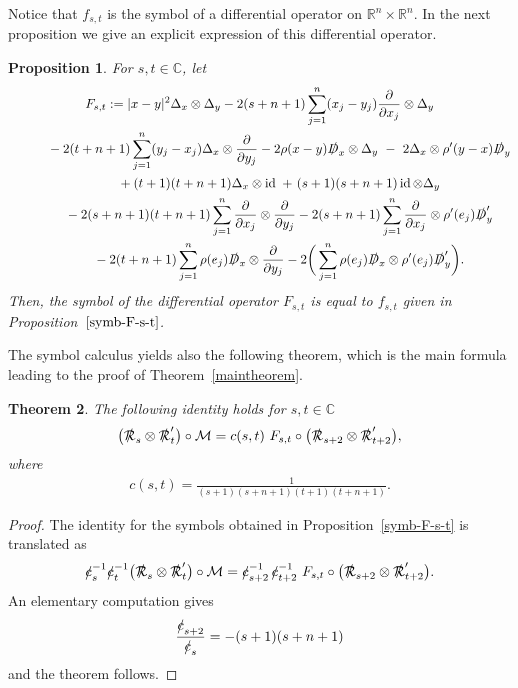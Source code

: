 \documentclass[pdftex]{sigma}
\DeclareMathOperator{\id}{id}
\newcommand{\fsl}[1]{{\slashed{#1}}} %
\numberwithin{equation}{section}
\newtheorem{theor}{Theorem}[section]
\newtheorem{prop}[theor]{Proposition}
\begin{document}
Notice that $f_{s,t}$ is the symbol of a differential operator on $\mathbb R^n\times \mathbb R^n$. In the next proposition we give an explicit expression of this differential operator.
\begin{prop}
 For $s,t\in \mathbb C$, let
\begin{gather*}
 F_{s,t} := \vert x-y\vert^2 \Delta_x\otimes \Delta_y
- 2(s+n+1) \sum_{j=1}^n (x_j-y_j) \frac{\partial}{\partial x_j} \otimes \Delta_y
\\ \hphantom{ F_{s,t} :=}
{}-2(t+n+1) \sum_{j=1}^n (y_j-x_j) \Delta_x\otimes \frac{\partial}{\partial y_j}
-2\rho(x-y)\fsl{D}_x\otimes \Delta_y\ -\ 2 \Delta_x\otimes \rho'(y-x) \fsl{D}_y
\\ \hphantom{ F_{s,t} :=}
{}+(t+1)(t+n+1) \Delta_x\otimes \id\ +\ (s+1)(s+n+1)\id\otimes\Delta_y
\\ \hphantom{ F_{s,t} :=}
{}-2(s+n+1)(t+n+1) \sum_{j=1}^n \frac{\partial}{\partial x_j} \otimes \frac{\partial}{\partial y_j}
-2(s+n+1) \sum_{j=1}^n \frac{\partial}{\partial x_j}\otimes \rho'(e_j)\fsl{D}'_y
\\ \hphantom{ F_{s,t} :=}
{}-2(t+n+1) \sum_{j=1}^n \rho(e_j)\fsl{D}_x\otimes \frac{\partial}{\partial y_j}
- 2\bigg(\sum_{j=1}^n \rho(e_j) \fsl{D}_x\otimes \rho'(e_j)\fsl{D}'_y\bigg).
\end{gather*}
Then, the symbol of the differential operator $F_{s,t}$ is equal to $f_{s,t}$ given in Proposition~$\ref{symb-F-s-t}$.
\end{prop}

The symbol calculus yields also the following theorem, which is the main formula leading to the proof of Theorem~\ref{maintheorem}.
\begin{theor} The following identity holds for $s,t\in \mathbb C$
\begin{gather}\label{estrr}
\big(\fsl{\mathcal R}_s\otimes \fsl{\mathcal R}'_t\big)\circ \mathcal M =c(s,t)\ F_{s,t}\circ \big(\fsl{\mathcal R}_{s+2} \otimes \fsl{\mathcal R}'_{t+2}\big),
\end{gather}
where
\begin{gather*}
c(s,t) = \frac{1}{(s+1)(s+n+1)(t+1)(t+n+1)}.
\end{gather*}
\end{theor}
\begin{proof} The identity for the symbols obtained in Proposition~\ref{symb-F-s-t} is translated as
\begin{gather*}
\fsl{c}_s^{-1} \fsl{c}_t^{-1}\big(\fsl{\mathcal R}_s\otimes \fsl{\mathcal R}_t'\big)\circ \mathcal M = \fsl{c}_{s+2}^{-1}\,\fsl{c}_{t+2}^{-1}\ F_{s,t}\circ\big(\fsl{\mathcal R}_{s+2}\otimes \fsl{\mathcal R}_{t+2}'\big).
\end{gather*}
An elementary computation gives
\begin{gather*}
\frac{\fsl{c}_{s+2}}{\fsl{c}_s} = -(s+1)(s+n+1)
\end{gather*}
and the theorem follows.
\end{proof}
\end{document}
